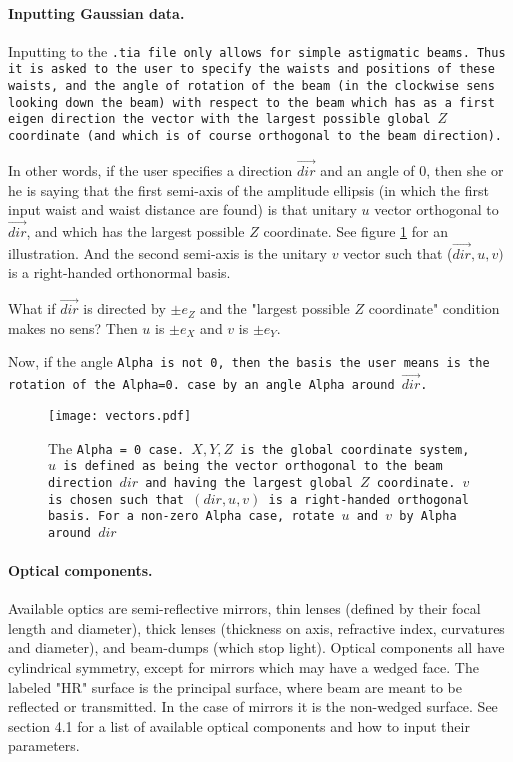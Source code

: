 \documentclass{article}
\begin{document}
\paragraph{Inputting Gaussian data.}Inputting to the \tt{.tia} file only allows for simple astigmatic beams. Thus it is asked to the user to specify the waists and positions of these waists, and the angle of rotation of the beam (in the clockwise sens looking down the beam) with respect to the beam which has as a first eigen direction the vector with the largest possible global $Z$ coordinate (and which is of course orthogonal to the beam direction).

In other words, if the user specifies a direction $\vec{dir}$ and an angle of 0, then she or he is saying that the first semi-axis of the amplitude ellipsis (in which the first input waist and waist distance are found) is that unitary $u$ vector orthogonal to $\vec{dir}$, and which has the largest possible $Z$ coordinate. See figure \ref{vectors} for an illustration. And the second semi-axis is the unitary $v$ vector such that ($\vec{dir}, u, v)$ is a right-handed orthonormal basis.

What if $\vec{dir}$ is directed by $\pm e_Z$ and the "largest possible $Z$ coordinate" condition makes no sens? Then $u$ is $\pm e_X$ and $v$ is $\pm e_Y$.

Now, if the angle \tt{Alpha} is not 0, then the basis the user means is the rotation of the \tt{Alpha=0.} case by an angle \tt{Alpha} around $\vec{dir}$.

\begin{figure}[h]
\begin{center}
\texttt{[image: vectors.pdf]}
\caption{The \tt{Alpha = 0} case. $X, Y, Z$ is the global coordinate system, $u$ is defined as being the vector orthogonal to the beam direction $dir$ and having the largest global $Z$ coordinate. $v$ is chosen such that $(dir, u, v)$ is a right-handed orthogonal basis. For a non-zero  \tt{Alpha} case, rotate $u$ and $v$ by \tt{Alpha} around $dir$}
\label{vectors}
\end{center}
\end{figure}

\paragraph{Optical components.}Available optics are semi-reflective mirrors, thin lenses (defined by their focal length and diameter), thick lenses (thickness on axis, refractive index, curvatures and diameter), and beam-dumps (which stop light). Optical components all have cylindrical symmetry, except for mirrors which may have a wedged face. The labeled "HR" surface is the principal surface, where beam are meant to be reflected or transmitted. In the case of mirrors it is the non-wedged surface. See section 4.1 for a list of available optical components and how to input their parameters.
\end{document}
